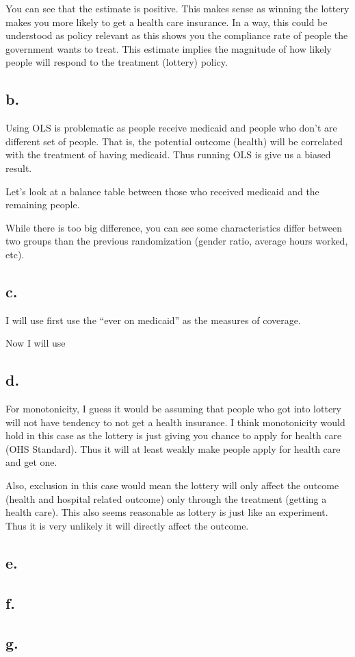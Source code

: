 \documentclass[
  letterpaper,
  DIV=11,
  numbers=noendperiod]{scrartcl}
\begin{document}
You can see that the estimate is positive. This makes sense as winning
the lottery makes you more likely to get a health care insurance. In a
way, this could be understood as policy relevant as this shows you the
compliance rate of people the government wants to treat. This estimate
implies the magnitude of how likely people will respond to the treatment
(lottery) policy.

\subsection{b.}\label{b.-1}

Using OLS is problematic as people receive medicaid and people who don't
are different set of people. That is, the potential outcome (health)
will be correlated with the treatment of having medicaid. Thus running
OLS is give us a biased result.

Let's look at a balance table between those who received medicaid and
the remaining people.

\clearpage

While there is too big difference, you can see some characteristics
differ between two groups than the previous randomization (gender ratio,
average hours worked, etc).

\subsection{c.}\label{c.-1}

I will use first use the ``ever on medicaid'' as the measures of
coverage.

Now I will use

\subsection{d.}\label{d.-1}

For monotonicity, I guess it would be assuming that people who got into
lottery will not have tendency to not get a health insurance. I think
monotonicity would hold in this case as the lottery is just giving you
chance to apply for health care (OHS Standard). Thus it will at least
weakly make people apply for health care and get one.

Also, exclusion in this case would mean the lottery will only affect the
outcome (health and hospital related outcome) only through the treatment
(getting a health care). This also seems reasonable as lottery is just
like an experiment. Thus it is very unlikely it will directly affect the
outcome.

\subsection{e.}\label{e.-1}

\subsection{f.}\label{f.}

\subsection{g.}\label{g.}
\end{document}
